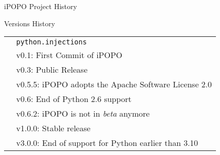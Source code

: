 \begin{frame}{iPOPO Project History}
\begin{block}{Versions History}
\centering
\begin{small}
\begin{table}
\begin{tabular}{@{\,}r <{\hskip 2pt} !{} >{\raggedright\arraybackslash}p{.5\textwidth}}
\addlinespace[1.5ex]
 & \texttt{python.injections} \\
 & v0.1: First Commit of iPOPO \\
 & v0.3: Public Release \\
 & v0.5.5: iPOPO adopts the Apache Software License 2.0 \\
 & v0.6: End of Python 2.6 support \\
 & v0.6.2: iPOPO is not in \textit{beta} anymore \\
 & v1.0.0: Stable release \\
 & v3.0.0: End of support for Python earlier than 3.10 \\
\end{tabular}
\end{table}
\end{small}
\end{block}
\end{frame}
